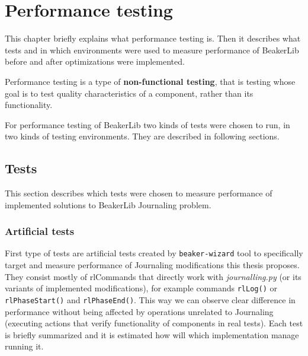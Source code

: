 \chapter{Performance testing}
\label{performance}

This chapter briefly explains what performance testing is. Then it describes what tests and in which environments were used to measure performance of BeakerLib before and after optimizations were implemented.


Performance testing is a type of \textbf{non-functional testing}, that is testing whose goal is to test quality characteristics of a component, rather than its functionality\cite{non-functional_testing}. 

For performance testing of BeakerLib two kinds of tests were chosen to run, in two kinds of testing environments. They are described in following sections.

\section{Tests}
\label{sec:tests}
This section describes which tests were chosen to measure performance of implemented solutions to BeakerLib Journaling problem. 

\subsection{Artificial tests}
First type of tests are artificial tests created by \texttt{beaker-wizard} tool to specifically target and measure performance of Journaling modifications this thesis proposes. They consist mostly of rlCommands that directly work with \textit{journalling.py} (or its variants of implemented modifications), for example commands \texttt{rlLog()} or \texttt{rlPhaseStart()} and \texttt{rlPhaseEnd()}. This way we can observe clear difference in performance without being affected by operations unrelated to Journaling (executing actions that verify functionality of components in real tests). Each test is briefly summarized and it is estimated how will which implementation manage running it.

